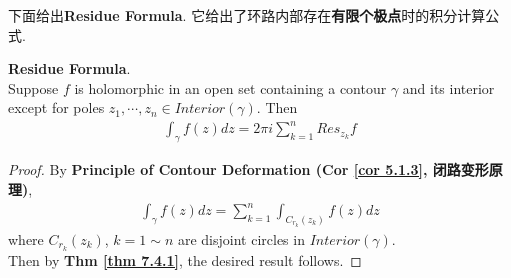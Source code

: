 \newpage
下面给出\textbf{Residue Formula}. 它给出了环路内部存在\textbf{有限个极点}时的积分计算公式.
\begin{thm}\label{thm 7.4.2}
	\textbf{Residue Formula}.\\
	Suppose $f$ is holomorphic in an open set containing a contour $\gamma$ and its interior except for poles $z_1 , \cdots , z_n \in Interior(\gamma)$. Then
	\begin{align}
		\int_{\gamma}{f(z) dz} = 2 \pi i \sum_{k = 1}^{n}{Res_{z_k}f}
	\end{align}
	
	\vspace{2em}
	\begin{proof}
		By \textbf{Principle of Contour Deformation (Cor \ref{cor 5.1.3}, 闭路变形原理)},
		\begin{align}
			\int_{\gamma}{f(z) dz} = \sum_{k = 1}^{n}{\int_{C_{r_k}(z_k)}{f(z) dz}}
		\end{align}
		where $C_{r_k}(z_k)$, $k = 1 \sim n$ are disjoint circles in $Interior(\gamma)$.\\
		Then by \textbf{Thm \ref{thm 7.4.1}}, the desired result follows.
	\end{proof}
\end{thm}

\newpage

